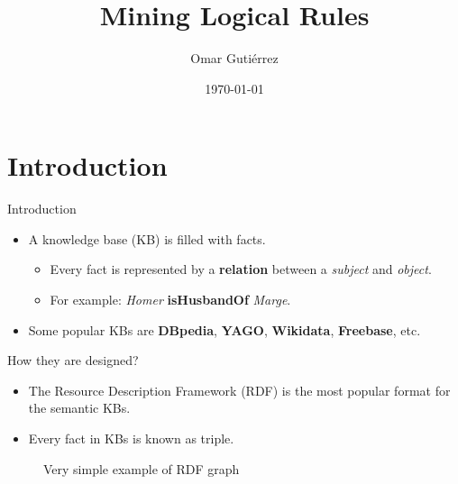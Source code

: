 \documentclass{beamer}
\title[Mining Logical Rules]{Mining Logical Rules}
\author{Omar Gutiérrez}
\institute{}
\date{\today}
\begin{document}
\begin{frame}
  \titlepage
\end{frame}


\section{Introduction}

\begin{frame}{Introduction}
\begin{itemize}
  \item A knowledge base (KB) is filled with facts.
  		\begin{itemize}

        \item Every fact is represented by a \textbf{relation} between a
            \textit{subject} and \textit{object}.
        \item For example: \textit{Homer} \textbf{isHusbandOf} \textit{Marge}.
  		\end{itemize}
  \item Some popular KBs are \textbf{DBpedia}, \textbf{YAGO}, \textbf{Wikidata}, \textbf{Freebase}, etc.
\end{itemize}

\end{frame}

\begin{frame}{How they are designed?}
\begin{itemize}
  \item The Resource Description Framework (RDF) is the most popular format for the semantic KBs.
  \item Every fact in KBs is known as triple.
\end{itemize}

\vskip 0.2cm

\begin{figure}
\resizebox{7.555cm}{!}{%
    
}
\caption{Very simple example of RDF graph}
\label{fig:rdf}
\end{figure}

\end{frame}
\end{document}
